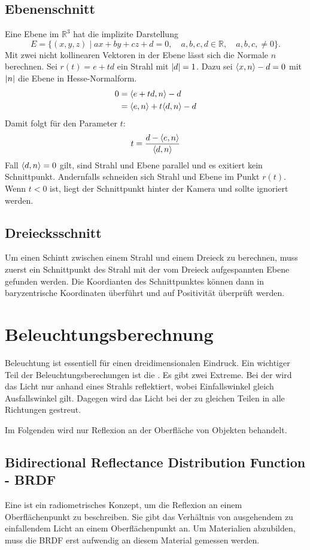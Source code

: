 \subsection{Ebenenschnitt}
Eine Ebene im $\mathbb{R}^3$ hat die implizite Darstellung
\[
	E = \{(x, y, z) \mid ax + by + cz + d = 0, \quad
	a, b, c, d \in \mathbb{R}, \quad
	a, b, c, \neq 0\} \text{.}
\]
Mit zwei nicht kollinearen Vektoren in der Ebene lässt sich die Normale $n$ berechnen.
Sei $r(t) = e + td$ ein Strahl mit $\vert d \vert = 1$.
Dazu sei $\langle x, n \rangle - d = 0$ mit $\vert n \vert$ die Ebene in Hesse-Normalform.
\begin{align*}
	0 &= \langle e + td, n \rangle - d \\
	  &= \langle e, n \rangle + t \langle d, n \rangle - d
\end{align*}
Damit folgt für den Parameter $t$:
\[
	t = \frac{d - \langle e, n \rangle}{\langle d, n \rangle}
\]
Fall $\langle d, n \rangle = 0$ gilt, sind Strahl und Ebene parallel und es exitiert kein Schnittpunkt.
Andernfalls schneiden sich Strahl und Ebene im Punkt $r(t)$.
Wenn $t < 0$ ist, liegt der Schnittpunkt hinter der Kamera und sollte ignoriert werden.

\subsection{Dreiecksschnitt}
Um einen Schintt zwischen einem Strahl und einem Dreieck zu berechnen, muss zuerst ein Schnittpunkt des Strahl mit der vom Dreieck aufgespannten Ebene gefunden werden.
Die Koordianten des Schnittpunktes können dann in baryzentrische Koordinaten überführt und auf Positivität überprüft werden.

\section{Beleuchtungsberechnung}
Beleuchtung ist essentiell für einen dreidimensionalen Eindruck.
Ein wichtiger Teil der Beleuchtungsberechungen ist die .
Es gibt zwei Extreme.
Bei der  wird das Licht nur anhand eines Strahls reflektiert, wobei Einfallswinkel gleich Ausfallswinkel gilt.
Dagegen wird das Licht bei der  zu gleichen Teilen in alle Richtungen gestreut.

Im Folgenden wird nur Reflexion an der Oberfläche von Objekten behandelt.

\subsection{Bidirectional Reflectance Distribution Function - BRDF}
Eine  ist ein radiometrisches Konzept, um die Reflexion an einem Oberflächenpunkt zu beschreiben.
Sie gibt das Verhältnis von ausgehendem zu einfallendem Licht an einem Oberflächenpunkt an.
Um Materialien abzubilden, muss die BRDF erst aufwendig an diesem Material gemessen werden.

